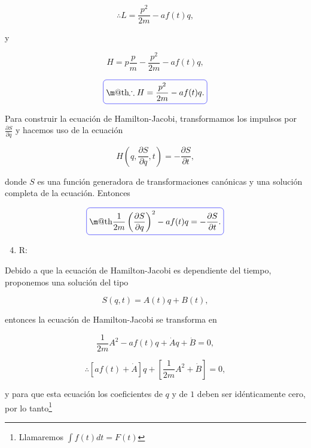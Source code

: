 \documentclass[a4paper,10pt]{article}
\makeatletter
\numberwithin{equation}{section}
\newcommand*{\boxcolor}{blue}
\renewcommand{\boxed}[1]{\textcolor{\boxcolor}{%
\tikz[baseline={([yshift=-1ex]current bounding box.center)}] \node [rectangle, minimum width=1ex,rounded corners,draw] {\normalcolor\m@th$\displaystyle#1$};}}
\makeatother
\begin{document}
\begin{equation}
 \therefore L = \frac{p^2}{2m} - af(t)q,
\end{equation}

y

\begin{equation}
 H = p\frac{p}{m} - \frac{p^2}{2m} - af(t)q,
\end{equation}

\begin{equation}
 \boxed{\therefore H = \frac{p^2}{2m} - af(t)q.}
\end{equation}

Para construir la ecuación de Hamilton-Jacobi, transformamos los impulsos por 
$\frac{\partial S}{\partial q}$ y hacemos uso de la ecuación 

\begin{equation}
 H\left(q,\frac{\partial S}{\partial q},t\right) = - \frac{\partial S}{\partial t},
\end{equation}

donde $S$ es una función generadora de transformaciones canónicas y una solución 
completa de la ecuación. Entonces 

\begin{equation}
 \boxed{\frac{1}{2m}\left(\frac{\partial S}{\partial q}\right)^2 - af(t)q = 
 - \frac{\partial S}{\partial t}.}
\end{equation}

\begin{enumerate}[label=\alph*)]
\setcounter{enumi}{3}
 \item R:
\end{enumerate}

Debido a que la ecuación de Hamilton-Jacobi es dependiente del tiempo, proponemos 
una solución del tipo 

\begin{equation}
 S(q,t) = A(t)q + B(t),
\end{equation}

entonces la ecuación de Hamilton-Jacobi se transforma en

\begin{equation}
\frac{1}{2m} A^2 - af(t)q + \dot{A}q + \dot{B} = 0,
\end{equation}

\begin{equation}
 \therefore [af(t) + \dot{A}]q + \left[\frac{1}{2m}A^2 + \dot{B} \right] = 0,
\end{equation}

y para que esta ecuación los coeficientes de $q$ y de $1$ deben ser idénticamente 
cero, por lo tanto\footnote{Llamaremos $\int f(t) dt = F(t)$}
\end{document}
